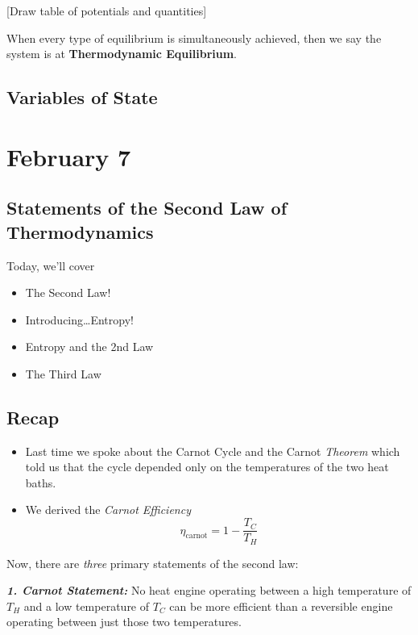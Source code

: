 \documentclass{article}
\begin{document}
\vskip 0.5cm
[Draw table of potentials and quantities]

\vskip 0.5cm
When every type of equilibrium is simultaneously achieved, then we say the system is at \textbf{Thermodynamic Equilibrium}.

\vskip 0.5cm
\subsection                     {Variables of State}


\pagebreak 
\section{February 7}

\subsection{Statements of the Second Law of Thermodynamics}

Today, we'll cover 
\begin{itemize}
  \item The Second Law!
  \item Introducing\dots Entropy!
  \item Entropy and the 2nd Law
  \item The Third Law
\end{itemize}

\subsection*{Recap}
\begin{itemize}
  \item Last time we spoke about the Carnot Cycle and the Carnot \emph{Theorem} which told us that the cycle depended only on the temperatures of the two heat baths.
  \item We derived the \emph{Carnot Efficiency}
  \[ \eta_{\text{carnot}} = 1 - \frac{T_C}{T_H} \]
\end{itemize}

Now, there are \emph{three} primary statements of the second law:

\begin{dottedbox}
  \emph{\textbf{1. Carnot Statement:}} No heat engine operating between a high temperature of $T_H$ and a low temperature of $T_C$ can be more efficient than a reversible engine operating between just those two temperatures.
\end{dottedbox}
\end{document}
